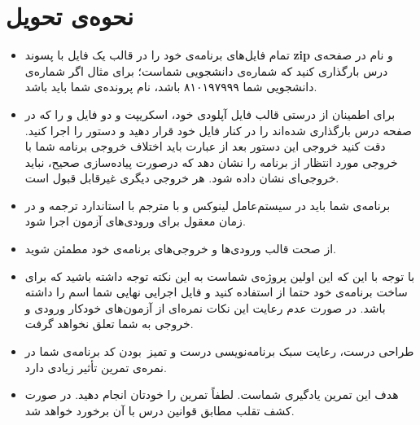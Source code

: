 \documentclass{utap}
\begin{document}
	\section{نحوه‌ی تحویل}
	\begin{itemize}
	\item
	تمام فایل‌های برنامه‌ی خود را در قالب یک فایل با پسوند \textbf{zip} و نام  در صفحه‌ی  درس بارگذاری کنید که  شماره‌ی دانشجویی شماست؛ برای مثال اگر شماره‌ی دانشجویی شما ۸۱۰۱۹۷۹۹۹ باشد، نام پرونده‌ی شما باید  باشد. 
	
	\item
	برای اطمینان از درستی قالب فایل آپلودی خود، اسکریپت 
	و دو فایل 
	و 
	 را که در صفحه درس بارگذاری شده‌اند را در کنار فایل خود قرار دهید و دستور
	را اجرا کنید. دقت کنید خروجی این دستور بعد از عبارت 
	باید اختلاف خروجی برنامه شما با خروجی مورد انتظار از برنامه را نشان دهد که درصورت پیاده‌سازی صحیح، نباید خروجی‌ای نشان داده شود. هر خروجی دیگری غیرقابل قبول است.
	
		\item برنامه‌ی شما باید در سیستم‌عامل لینوکس و با مترجم  با استاندارد  ترجمه و در زمان معقول برای ورودی‌های آزمون اجرا شود.
		\item از صحت قالب ورودی‌ها و خروجی‌های برنامه‌ی خود مطمئن شوید.
		\item با توجه با این که این اولین پروژه‌ی  شماست به این نکته توجه داشته باشید که برای ساخت برنامه‌ی خود حتما از  استفاده کنید و فایل اجرایی نهایی شما اسم  را داشته باشد. در صورت عدم رعایت این نکات نمره‌ای از آزمون‌های خودکار ورودی و خروجی به شما تعلق نخواهد گرفت.
		\item طراحی درست، رعایت سبک برنامه‌نویسی درست و تمیز~بودن کد برنامه‌ی شما در نمره‌ی تمرین تأثیر زیادی دارد.
		\item هدف این تمرین یادگیری شماست. لطفاً تمرین را خودتان انجام دهید. در صورت کشف تقلب مطابق قوانین درس با آن برخورد خواهد شد.
	\end{itemize}
	
	
\end{document}
